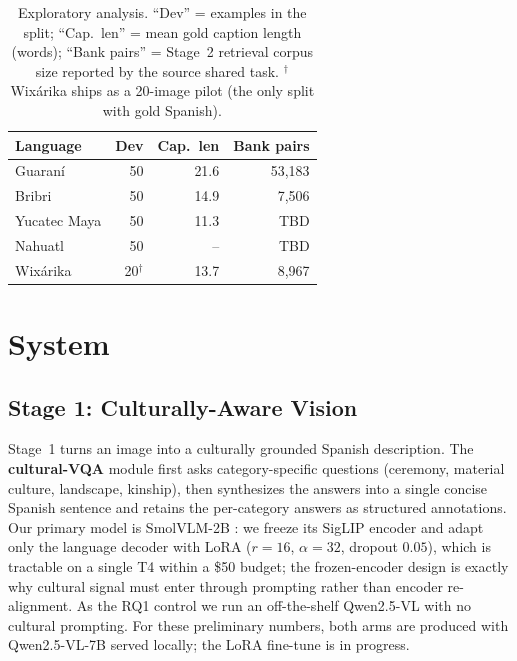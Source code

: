 \documentclass[11pt]{article}
\begin{document}
\begin{table}[t]
\centering
\small
\begin{tabular}{lrrr}
\toprule
\textbf{Language} & \textbf{Dev} & \textbf{Cap.\ len} & \textbf{Bank pairs} \\
\midrule
Guaraní       & 50            & 21.6 & 53{,}183 \\
Bribri        & 50            & 14.9 & 7{,}506 \\
Yucatec Maya  & 50            & 11.3 & TBD \\
Nahuatl       & 50            & --   & TBD \\
Wixárika      & 20$^{\dagger}$ & 13.7 & 8{,}967 \\
\bottomrule
\end{tabular}
\caption{Exploratory analysis. ``Dev'' = examples in the split; ``Cap.\ len'' =
mean gold caption length (words); ``Bank pairs'' = Stage~2 retrieval corpus size
reported by the source shared task. $^{\dagger}$Wixárika ships as a 20-image
pilot (the only split with gold Spanish).}
\label{tab:eda}
\end{table}

\section{System}

\subsection{Stage 1: Culturally-Aware Vision}
Stage~1 turns an image into a culturally grounded Spanish description. The
\textbf{cultural-VQA} module first asks category-specific questions (ceremony,
material culture, landscape, kinship), then synthesizes the answers into a single
concise Spanish sentence and retains the per-category answers as structured
annotations. Our primary model is SmolVLM-2B \citep{marafioti2025smolvlm}: we
freeze its SigLIP encoder \citep{zhai2023siglip} and adapt only the language
decoder with LoRA \citep{hu2022lora} ($r{=}16$, $\alpha{=}32$, dropout $0.05$),
which is tractable on a single T4 within a \$50 budget; the frozen-encoder design
is exactly why cultural signal must enter through prompting rather than encoder
re-alignment. As the RQ1 control we run an off-the-shelf Qwen2.5-VL
\citep{qwen2025qwen25vl} with no cultural prompting. For these preliminary
numbers, both arms are produced with Qwen2.5-VL-7B served locally; the LoRA
fine-tune is in progress.
\end{document}
